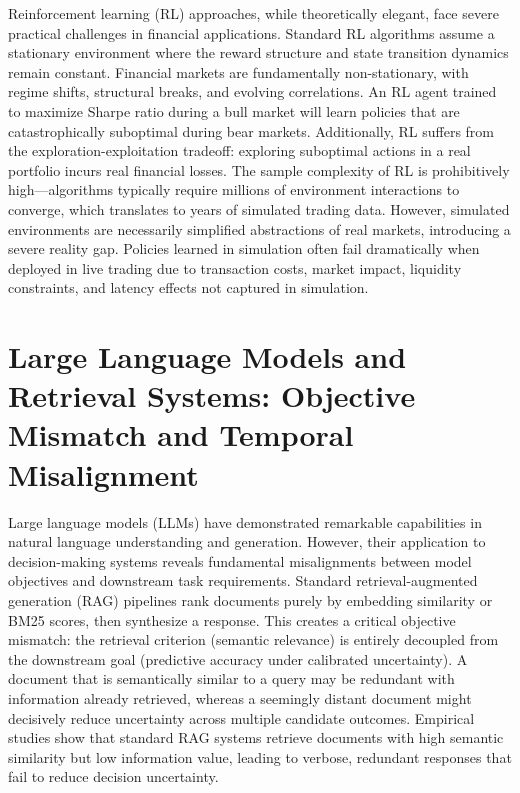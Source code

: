 \documentclass[12pt,a4paper,oneside]{report}
\theoremstyle{definition}
\theoremstyle{remark}
\begin{document}
Reinforcement learning (RL) approaches, while theoretically elegant, face severe practical challenges in financial applications. Standard RL algorithms assume a stationary environment where the reward structure and state transition dynamics remain constant. Financial markets are fundamentally non-stationary, with regime shifts, structural breaks, and evolving correlations. An RL agent trained to maximize Sharpe ratio during a bull market will learn policies that are catastrophically suboptimal during bear markets. Additionally, RL suffers from the exploration-exploitation tradeoff: exploring suboptimal actions in a real portfolio incurs real financial losses. The sample complexity of RL is prohibitively high—algorithms typically require millions of environment interactions to converge, which translates to years of simulated trading data. However, simulated environments are necessarily simplified abstractions of real markets, introducing a severe reality gap. Policies learned in simulation often fail dramatically when deployed in live trading due to transaction costs, market impact, liquidity constraints, and latency effects not captured in simulation.

\section{Large Language Models and Retrieval Systems: Objective Mismatch and Temporal Misalignment}

Large language models (LLMs) have demonstrated remarkable capabilities in natural language understanding and generation. However, their application to decision-making systems reveals fundamental misalignments between model objectives and downstream task requirements. Standard retrieval-augmented generation (RAG) pipelines rank documents purely by embedding similarity or BM25 scores, then synthesize a response. This creates a critical objective mismatch: the retrieval criterion (semantic relevance) is entirely decoupled from the downstream goal (predictive accuracy under calibrated uncertainty). A document that is semantically similar to a query may be redundant with information already retrieved, whereas a seemingly distant document might decisively reduce uncertainty across multiple candidate outcomes. Empirical studies show that standard RAG systems retrieve documents with high semantic similarity but low information value, leading to verbose, redundant responses that fail to reduce decision uncertainty.
\end{document}
